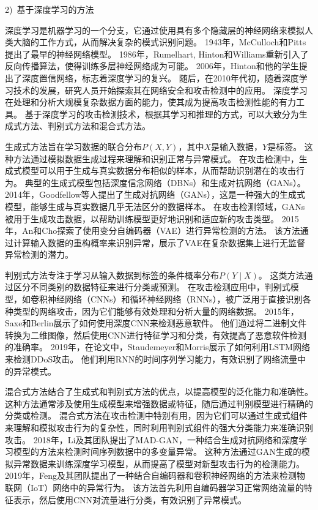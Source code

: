2)~基于深度学习的方法\par
深度学习是机器学习的一个分支，它通过使用具有多个隐藏层的神经网络来模拟人类大脑的工作方式，从而解决复杂的模式识别问题。
1943年，McCulloch和Pitts提出了最早的神经网络模型。
1986年，Rumelhart, Hinton和Williams重新引入了反向传播算法，使得训练多层神经网络成为可能。
2006年，Hinton和他的学生提出了深度置信网络，标志着深度学习的复兴。
随后，在2010年代初，随着深度学习技术的发展，研究人员开始探索其在网络安全和攻击检测中的应用。
深度学习在处理和分析大规模复杂数据方面的能力，使其成为提高攻击检测性能的有力工具。
基于深度学习的攻击检测技术，根据其学习和推理的方式，可以大致分为生成式方法、判别式方法和混合式方法。

生成式方法旨在学习数据的联合分布$P(X,Y)$，其中$X$是输入数据，$Y$是标签。
这种方法通过模拟数据生成过程来理解和识别正常与异常模式。
在攻击检测中，生成式模型可以用于生成与真实数据分布相似的样本，从而帮助识别潜在的攻击行为。
典型的生成式模型包括深度信念网络（DBNs）和生成对抗网络（GANs）。
2014年，Goodfellow等人提出了生成对抗网络（GANs）\cite{goodfellow2014generative}，这是一种强大的生成式模型，能够生成与真实数据几乎无法区分的数据样本。
在攻击检测领域，GANs被用于生成攻击数据，以帮助训练模型更好地识别和适应新的攻击类型。
2015年，An和Cho探索了使用变分自编码器（VAE）进行异常检测的方法\cite{an2015variational}。
该方法通过计算输入数据的重构概率来识别异常，展示了VAE在复杂数据集上进行无监督异常检测的潜力。

判别式方法专注于学习从输入数据到标签的条件概率分布$P(Y∣X)$。
这类方法通过区分不同类别的数据特征来进行分类或预测。
在攻击检测应用中，判别式模型，如卷积神经网络（CNNs）和循环神经网络（RNNs），被广泛用于直接识别各种类型的网络攻击，因为它们能够有效处理和分析大量的网络数据。
2015年，Saxe和Berlin展示了如何使用深度CNN来检测恶意软件\cite{saxe2015deep}。
他们通过将二进制文件转换为二维图像，然后使用CNN进行特征学习和分类，有效提高了恶意软件检测的准确率。
2019年，在论文中，Staudemeyer和Morris展示了如何利用LSTM网络来检测DDoS攻击。
他们利用RNN的时间序列学习能力，有效识别了网络流量中的异常模式。

混合式方法结合了生成式和判别式方法的优点，以提高模型的泛化能力和准确性。
这种方法通常涉及使用生成模型来增强数据或特征，随后通过判别模型进行精确的分类或检测。
混合式方法在攻击检测中特别有用，因为它们可以通过生成式组件来理解和模拟攻击行为的复杂性，同时利用判别式组件的强大分类能力来准确识别攻击。
2018年，Li及其团队提出了MAD-GAN\cite{li2018mad}，一种结合生成对抗网络和深度学习模型的方法来检测时间序列数据中的多变量异常。
这种方法通过GAN生成的模拟异常数据来训练深度学习模型，从而提高了模型对新型攻击行为的检测能力。
2019年，Feng及其团队提出了一种结合自编码器和卷积神经网络的方法来检测物联网（IoT）网络中的异常行为\cite{feng2019deep}。
该方法首先利用自编码器学习正常网络流量的特征表示，然后使用CNN对流量进行分类，有效识别了异常模式。

